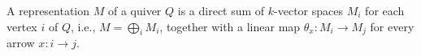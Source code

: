 A representation $M$ of a quiver $Q$ is a direct sum of $k$-vector spaces
$M_i$ for each vertex $i$ of $Q$, i.e., $M = \bigoplus_i M_i$, together with
a linear map $\theta_x\colon M_i\to M_j$ for every arrow $x\colon i\to j$.
